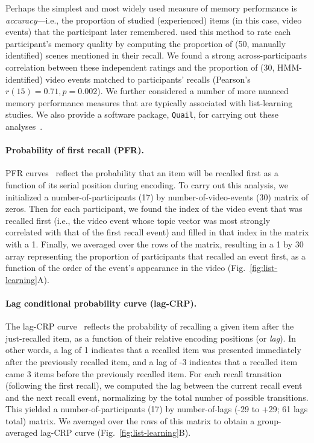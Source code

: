 \documentclass{article}
\begin{document}
Perhaps the simplest and most widely used measure of memory performance is \textit{accuracy}---i.e., the proportion of studied (experienced) items (in this case, video events) that the participant later remembered.  \cite{ChenEtal17} used this method to rate each participant's memory quality by computing the proportion of (50, manually identified) scenes mentioned in their recall.  We found a strong across-participants correlation between these independent ratings and the proportion of (30, HMM-identified) video events matched to participants' recalls (Pearson's $r(15) = 0.71, p = 0.002$).  We further considered a number of more nuanced memory performance measures that are typically associated with list-learning studies.  We also provide a software package, \texttt{Quail}, for carrying out these analyses~\citep{HeusEtal17b}.

\paragraph{Probability of first recall (PFR).}  PFR curves~\citep{WelcBurn24, PostPhil65, AtkiShif68} reflect the probability that an item will be recalled first as a function of its serial position during encoding. To carry out this analysis, we initialized a number-of-participants (17) by number-of-video-events (30) matrix of zeros. Then for each participant, we found the index of the video event that was recalled first (i.e., the video event whose topic vector was most strongly correlated with that of the first recall event) and filled in that index in the matrix with a 1.  Finally, we averaged over the rows of the matrix, resulting in a 1 by 30 array representing the proportion of participants that recalled an event first, as a function of the order of the event's appearance in the video (Fig.~\ref{fig:list-learning}A).

\paragraph{Lag conditional probability curve (lag-CRP).} The lag-CRP curve~\citep{Kaha96} reflects the probability of recalling a given item after the just-recalled item, as a function of their relative encoding positions (or \textit{lag}).  In other words, a lag of 1 indicates that a recalled item was presented immediately after the previously recalled item, and a lag of -3 indicates that a recalled item came 3 items before the previously recalled item.  For each recall transition (following the first recall), we computed the lag between the current recall event and the next recall event, normalizing by the total number of possible transitions.  This yielded a number-of-participants (17) by number-of-lags (-29 to +29; 61 lags total) matrix. We averaged over the rows of this matrix to obtain a group-averaged lag-CRP curve (Fig.~\ref{fig:list-learning}B).
\end{document}
